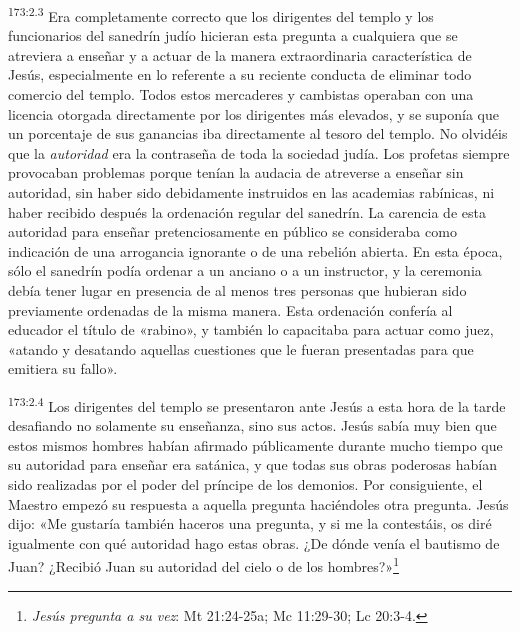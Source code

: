 \par
\textsuperscript{173:2.3} Era completamente correcto que los dirigentes del templo y los funcionarios del sanedrín judío hicieran esta pregunta a cualquiera que se atreviera a enseñar y a actuar de la manera extraordinaria característica de Jesús, especialmente en lo referente a su reciente conducta de eliminar todo comercio del templo. Todos estos mercaderes y cambistas operaban con una licencia otorgada directamente por los dirigentes más elevados, y se suponía que un porcentaje de sus ganancias iba directamente al tesoro del templo. No olvidéis que la \textit{autoridad} era la contraseña de toda la sociedad judía. Los profetas siempre provocaban problemas porque tenían la audacia de atreverse a enseñar sin autoridad, sin haber sido debidamente instruidos en las academias rabínicas, ni haber recibido después la ordenación regular del sanedrín. La carencia de esta autoridad para enseñar pretenciosamente en público se consideraba como indicación de una arrogancia ignorante o de una rebelión abierta. En esta época, sólo el sanedrín podía ordenar a un anciano o a un instructor, y la ceremonia debía tener lugar en presencia de al menos tres personas que hubieran sido previamente ordenadas de la misma manera. Esta ordenación confería al educador el título de «rabino», y también lo capacitaba para actuar como juez, «atando y desatando aquellas cuestiones que le fueran presentadas para que emitiera su fallo».

\par
\textsuperscript{173:2.4} Los dirigentes del templo se presentaron ante Jesús a esta hora de la tarde desafiando no solamente su enseñanza, sino sus actos. Jesús sabía muy bien que estos mismos hombres habían afirmado públicamente durante mucho tiempo que su autoridad para enseñar era satánica, y que todas sus obras poderosas habían sido realizadas por el poder del príncipe de los demonios. Por consiguiente, el Maestro empezó su respuesta a aquella pregunta haciéndoles otra pregunta. Jesús dijo: «Me gustaría también haceros una pregunta, y si me la contestáis, os diré igualmente con qué autoridad hago estas obras. ¿De dónde venía el bautismo de Juan? ¿Recibió Juan su autoridad del cielo o de los hombres?»\footnote{\textit{Jesús pregunta a su vez}: Mt 21:24-25a; Mc 11:29-30; Lc 20:3-4.}

